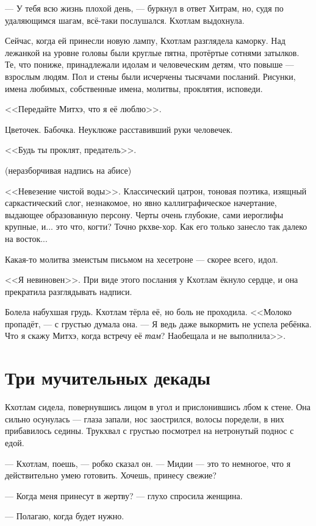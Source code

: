 --- У тебя всю жизнь плохой день, --- буркнул в ответ Хитрам, но, судя по удаляющимся шагам, всё-таки послушался.
Кхотлам выдохнула.

\asterism

Сейчас, когда ей принесли новую лампу, Кхотлам разглядела каморку.
Над лежанкой на уровне головы были круглые пятна, протёртые сотнями затылков.
Те, что пониже, принадлежали идолам и человеческим детям, что повыше --- взрослым людям.
Пол и стены были исчерчены тысячами посланий.
Рисунки, имена любимых, собственные имена, молитвы, проклятия, исповеди.

<<Передайте Митхэ, что я её люблю>>.

Цветочек.
Бабочка.
Неуклюже расставивший руки человечек.

<<Будь ты проклят, предатель>>.

(неразборчивая надпись на абисе)

<<Невезение чистой воды>>.
Классический цатрон, тоновая поэтика, изящный саркастический слог, незнакомое, но явно каллиграфическое начертание, выдающее образованную персону.
Черты очень глубокие, сами иероглифы крупные, и... это что, когти?
Точно ркхве-хор.
Как его только занесло так далеко на восток...

Какая-то молитва змеистым письмом на хесетроне --- скорее всего, идол.

<<Я невиновен>>.
При виде этого послания у Кхотлам ёкнуло сердце, и она прекратила разглядывать надписи.

Болела набухшая грудь.
Кхотлам тёрла её, но боль не проходила.
<<Молоко пропадёт, --- с грустью думала она.
--- Я ведь даже выкормить не успела ребёнка.
Что я скажу Митхэ, когда встречу её \emph{там}?
Наобещала и не выполнила>>.

\section{Три мучительных декады}

Кхотлам сидела, повернувшись лицом в угол и прислонившись лбом к стене.
Она сильно осунулась --- глаза запали, нос заострился, волосы поредели, в них прибавилось седины.
Трукхвал с грустью посмотрел на нетронутый поднос с едой.

--- Кхотлам, поешь, --- робко сказал он.
--- Мидии --- это то немногое, что я действительно умею готовить.
Хочешь, принесу свежие?

--- Когда меня принесут в жертву? --- глухо спросила женщина.

--- Полагаю, когда будет нужно.

